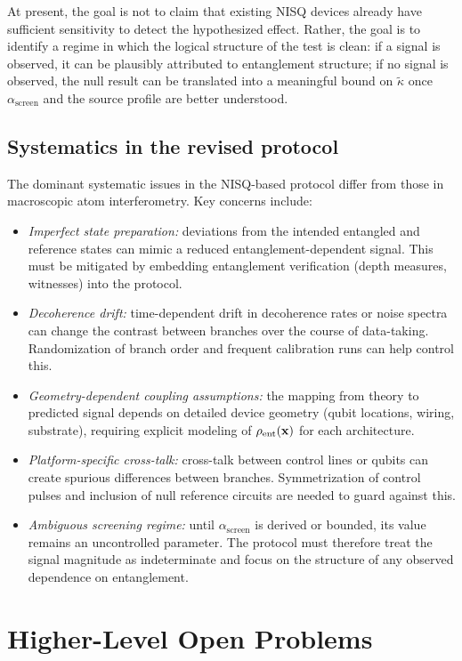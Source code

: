 \documentclass[11pt]{article}
\begin{document}
At present, the goal is not to claim that existing NISQ devices already have sufficient sensitivity to detect the hypothesized effect. Rather, the goal is to identify a regime in which the logical structure of the test is clean: if a signal is observed, it can be plausibly attributed to entanglement structure; if no signal is observed, the null result can be translated into a meaningful bound on $\tilde{\kappa}$ once $\alpha_{\text{screen}}$ and the source profile are better understood.

\subsection{Systematics in the revised protocol}

The dominant systematic issues in the NISQ-based protocol differ from those in macroscopic atom interferometry. Key concerns include:
\begin{itemize}
 \item \emph{Imperfect state preparation:} deviations from the intended entangled and reference states can mimic a reduced entanglement-dependent signal. This must be mitigated by embedding entanglement verification (depth measures, witnesses) into the protocol.
 \item \emph{Decoherence drift:} time-dependent drift in decoherence rates or noise spectra can change the contrast between branches over the course of data-taking. Randomization of branch order and frequent calibration runs can help control this.
 \item \emph{Geometry-dependent coupling assumptions:} the mapping from theory to predicted signal depends on detailed device geometry (qubit locations, wiring, substrate), requiring explicit modeling of $\rho_{\text{ent}}(\vb{x})$ for each architecture.
 \item \emph{Platform-specific cross-talk:} cross-talk between control lines or qubits can create spurious differences between branches. Symmetrization of control pulses and inclusion of null reference circuits are needed to guard against this.
 \item \emph{Ambiguous screening regime:} until $\alpha_{\text{screen}}$ is derived or bounded, its value remains an uncontrolled parameter. The protocol must therefore treat the signal magnitude as indeterminate and focus on the structure of any observed dependence on entanglement.
\end{itemize}

\section{Higher-Level Open Problems}
\end{document}
